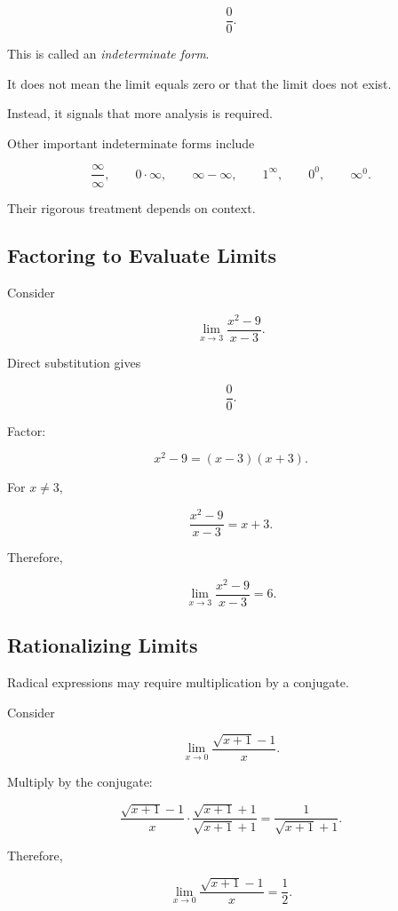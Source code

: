 \[ \frac00. \]

This is called an \emph{indeterminate form}.

It does not mean the limit equals zero or that the limit does not exist.

Instead, it signals that more analysis is required.

Other important indeterminate forms include

\[ \frac{\infty}{\infty},\qquad
0\cdot\infty,\qquad
\infty-\infty,\qquad
1^\infty,\qquad
0^0,\qquad
\infty^0. \]

Their rigorous treatment depends on context.

\subsection{Factoring to Evaluate Limits}
\label{subsec:factoring-limits}

Consider

\[ \lim_{x\to3}\frac{x^2-9}{x-3}. \]

Direct substitution gives

\[ \frac00. \]

Factor:

\[ x^2-9=(x-3)(x+3). \]

For \(x\neq3\),

\[ \frac{x^2-9}{x-3}=x+3. \]

Therefore,

\[ \boxed{\lim_{x\to3}\frac{x^2-9}{x-3}=6.} \]

\subsection{Rationalizing Limits}
\label{subsec:rationalizing-limits}

Radical expressions may require multiplication by a conjugate.

Consider

\[ \lim_{x\to0}\frac{\sqrt{x+1}-1}{x}. \]

Multiply by the conjugate:

\[
\frac{\sqrt{x+1}-1}{x}
\cdot
\frac{\sqrt{x+1}+1}{\sqrt{x+1}+1}
=
\frac{1}{\sqrt{x+1}+1}.
\]

Therefore,

\[ \boxed{\lim_{x\to0}\frac{\sqrt{x+1}-1}{x}=\frac12.} \]

